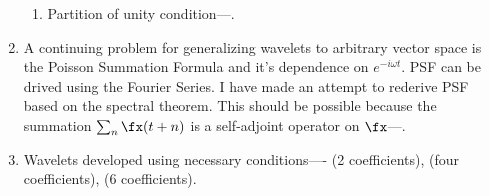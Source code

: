 \begin{enumerate}
\begin{enumerate}
  \item Partition of unity condition---.

\end{enumerate}

\item A continuing problem for generalizing wavelets to arbitrary vector space is the 
      Poisson Summation Formula and it's dependence on $e^{-i\omega t}$.
      PSF can be drived using the Fourier Series.
      I have made an attempt to rederive PSF based on the spectral theorem.
      This should be possible because the summation $\sum_n \fx(t+n)$ is a 
      self-adjoint operator on $\fx$---.


\item Wavelets developed using necessary conditions---- 
       (2 coefficients),  (four coefficients),
       (6 coefficients).

\end{enumerate}






















